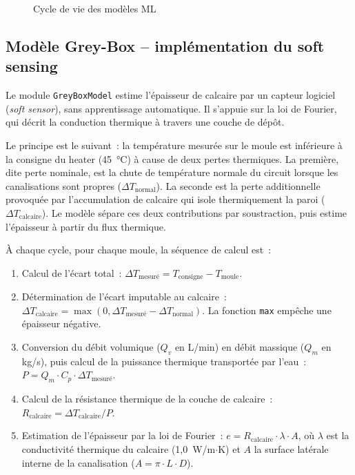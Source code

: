 \begin{figure}[htbp]
  \centering
  \caption{Cycle de vie des modèles ML}
  \label{fig:lifecycle}
\end{figure}

\subsection{Modèle Grey-Box -- implémentation du soft sensing}

Le module \texttt{GreyBoxModel} estime l'épaisseur de calcaire par un capteur logiciel (\emph{soft sensor}), sans apprentissage automatique. Il s'appuie sur la loi de Fourier, qui décrit la conduction thermique à travers une couche de dépôt.

Le principe est le suivant~: la température mesurée sur le moule est inférieure à la consigne du heater (45~\si{\celsius}) à cause de deux pertes thermiques. La première, dite perte nominale, est la chute de température normale du circuit lorsque les canalisations sont propres (\( \Delta T_{\text{normal}} \)). La seconde est la perte additionnelle provoquée par l'accumulation de calcaire qui isole thermiquement la paroi (\( \Delta T_{\text{calcaire}} \)). Le modèle sépare ces deux contributions par soustraction, puis estime l'épaisseur à partir du flux thermique.

À chaque cycle, pour chaque moule, la séquence de calcul est~:

\begin{enumerate}
  \item Calcul de l'écart total~: \(\Delta T_{\text{mesuré}} = T_{\text{consigne}} - T_{\text{moule}}\).
  \item Détermination de l'écart imputable au calcaire~: \(\Delta T_{\text{calcaire}} = \max(0, \Delta T_{\text{mesuré}} - \Delta T_{\text{normal}})\). La fonction \texttt{max} empêche une épaisseur négative.
  \item Conversion du débit volumique (\(Q_v\) en L/min) en débit massique (\(Q_m\) en kg/s), puis calcul de la puissance thermique transportée par l'eau~: \(P = Q_m \cdot C_p \cdot \Delta T_{\text{mesuré}}\).
  \item Calcul de la résistance thermique de la couche de calcaire~: \(R_{\text{calcaire}} = \Delta T_{\text{calcaire}} / P\).
  \item Estimation de l'épaisseur par la loi de Fourier~: \(e = R_{\text{calcaire}} \cdot \lambda \cdot A\), où \(\lambda\) est la conductivité thermique du calcaire (1,0~W/m\(\cdot\)K) et \(A\) la surface latérale interne de la canalisation (\(A = \pi \cdot L \cdot D\)).
\end{enumerate}

